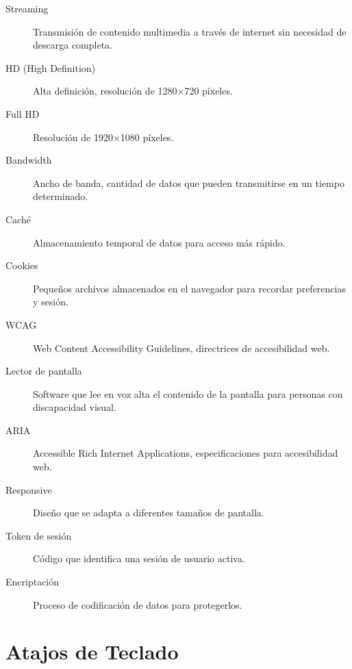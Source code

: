 \documentclass[11pt,a4paper,twoside]{book}
\begin{document}
\begin{description}
    \item[Streaming] Transmisión de contenido multimedia a través de internet sin necesidad de descarga completa.
    \item[HD (High Definition)] Alta definición, resolución de 1280×720 píxeles.
    \item[Full HD] Resolución de 1920×1080 píxeles.
    \item[Bandwidth] Ancho de banda, cantidad de datos que pueden transmitirse en un tiempo determinado.
    \item[Caché] Almacenamiento temporal de datos para acceso más rápido.
    \item[Cookies] Pequeños archivos almacenados en el navegador para recordar preferencias y sesión.
    \item[WCAG] Web Content Accessibility Guidelines, directrices de accesibilidad web.
    \item[Lector de pantalla] Software que lee en voz alta el contenido de la pantalla para personas con discapacidad visual.
    \item[ARIA] Accessible Rich Internet Applications, especificaciones para accesibilidad web.
    \item[Responsive] Diseño que se adapta a diferentes tamaños de pantalla.
    \item[Token de sesión] Código que identifica una sesión de usuario activa.
    \item[Encriptación] Proceso de codificación de datos para protegerlos.
\end{description}

\chapter{Atajos de Teclado}
\end{document}
